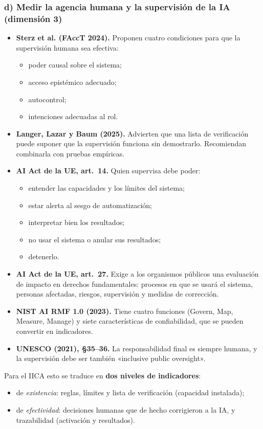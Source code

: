 \documentclass[11pt,a4paper]{article}
\begin{document}
\subsubsection*{d) Medir la agencia humana y la supervisión de la IA (dimensión 3)}
\begin{itemize}
  \item \textbf{Sterz et al. (FAccT 2024).} Proponen cuatro condiciones para que la supervisión humana sea efectiva:
  \begin{itemize}
    \item poder causal sobre el sistema;
    \item acceso epistémico adecuado;
    \item autocontrol;
    \item intenciones adecuadas al rol.
  \end{itemize}
  \item \textbf{Langer, Lazar y Baum (2025).} Advierten que una lista de verificación puede suponer que la supervisión funciona sin demostrarlo. Recomiendan combinarla con pruebas empíricas.
  \item \textbf{AI Act de la UE, art.~14.} Quien supervisa debe poder:
  \begin{itemize}
    \item entender las capacidades y los límites del sistema;
    \item estar alerta al sesgo de automatización;
    \item interpretar bien los resultados;
    \item no usar el sistema o anular sus resultados;
    \item detenerlo.
  \end{itemize}
  \item \textbf{AI Act de la UE, art.~27.} Exige a los organismos públicos una evaluación de impacto en derechos fundamentales: procesos en que se usará el sistema, personas afectadas, riesgos, supervisión y medidas de corrección.
  \item \textbf{NIST AI RMF 1.0 (2023).} Tiene cuatro funciones (Govern, Map, Measure, Manage) y siete características de confiabilidad, que se pueden convertir en indicadores.
  \item \textbf{UNESCO (2021), §35--36.} La responsabilidad final es siempre humana, y la supervisión debe ser también «inclusive public oversight».
\end{itemize}
Para el IICA esto se traduce en \textbf{dos niveles de indicadores}:
\begin{itemize}
  \item de \emph{existencia}: reglas, límites y lista de verificación (capacidad instalada);
  \item de \emph{efectividad}: decisiones humanas que de hecho corrigieron a la IA, y trazabilidad (activación y resultados).
\end{itemize}
\end{document}
